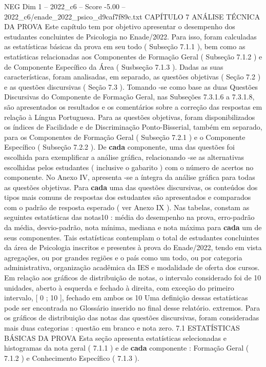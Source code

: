 \begin{textsample}{NEG Dim 1 – 2022\_c6 – Score -5.00 – 2022\_c6/enade\_2022\_psico\_d9caf7f89c.txt}  \label{ex:f1_neg_186}
CAPÍTULO 7 ANÁLISE TÉCNICA DA PROVA Este capítulo tem por objetivo apresentar o desempenho dos estudantes concluintes de Psicologia no Enade/2022.
Para isso, foram calculadas as estatísticas básicas da prova em seu todo ( Subseção 7.1.1 ), bem como as estatísticas relacionadas aos Componentes de Formação Geral ( Subseção 7.1.2 ) e de Componente Específico da Área ( Susbseção 7.1.3 ).
Dadas as suas características, foram analisadas, em separado, as questões objetivas ( Seção 7.2 ) e as questões discursivas ( Seção 7.3 ).
Tomando -se como base as duas Questões Discursivas do Componente de Formação Geral, nas Subseções 7.3.1.6 a 7.3.1.8, são apresentados os resultados e os comentários sobre a correção das respostas em relação à Língua Portuguesa.
Para as questões objetivas, foram disponibilizados os índices de Facilidade e de Discriminação Ponto-Bisserial, também em separado, para os Componentes de Formação Geral ( Subseção 7.2.1 ) e o Componente Específico ( Subseção 7.2.2 ).
De \textbf{cada} componente, uma das questões foi escolhida para exemplificar a análise gráfica, relacionando -se as alternativas escolhidas pelos estudantes ( inclusive o gabarito ) com o número de acertos no componente.
No Anexo IV, apresenta -se a íntegra da análise gráfica para todas as questões objetivas.
Para \textbf{cada} uma das questões discursivas, os conteúdos dos tipos mais comuns de respostas dos estudantes são apresentados e comparados com o padrão de resposta esperado ( ver Anexo IX ).
Nas tabelas, constam as seguintes estatísticas das notas10 : média do desempenho na prova, erro-padrão da média, desvio-padrão, nota mínima, mediana e nota máxima para \textbf{cada} um de seus componentes.
Tais estatísticas contemplam o total de estudantes concluintes da área de Psicologia inscritos e presentes à prova do Enade/2022, tendo em vista agregações, ou por grandes regiões e o país como um todo, ou por categoria administrativa, organização acadêmica da IES e modalidade de oferta dos cursos.
Em relação aos gráficos de distribuição de notas, o intervalo considerado foi de 10 unidades, aberto à esquerda e fechado à direita, com exceção do primeiro intervalo, [ 0 ; 10 ], fechado em ambos os 10 Uma definição dessas estatísticas pode ser encontrada no Glossário inserido no final desse relatório. extremos.
Para os gráficos de distribuição das notas das questões discursivas, foram consideradas mais duas categorias : questão em branco e nota zero. 7.1 ESTATÍSTICAS BÁSICAS DA PROVA Esta seção apresenta estatísticas selecionadas e histogramas da nota geral ( 7.1.1 ) e de \textbf{cada} componente : Formação Geral ( 7.1.2 ) e Conhecimento Específico ( 7.1.3 ).

\end{textsample}
